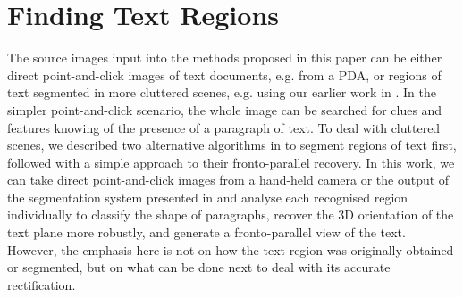 \section{Finding Text Regions}   \label{recoveryusinglines}



The source images input into the methods proposed in this paper can be either
direct point-and-click images of text documents, e.g. from a PDA, or regions of text
segmented in more cluttered scenes, e.g. using our earlier work in
\cite{clark-ijdar-2001}. In the simpler point-and-click scenario, 
the whole image can be searched for clues and features knowing of the presence
of a paragraph of text. To deal with cluttered scenes, we described two alternative
algorithms in \cite{clark-ijdar-2001} to segment regions of text first, followed
with a simple approach to their fronto-parallel recovery. In this work, we can
take direct point-and-click images from a hand-held camera or 
the output of the segmentation system presented in
\cite{clark-ijdar-2001} and analyse each recognised region individually to
classify the shape of paragraphs, recover the 3D orientation of the text plane
more robustly, and generate a fronto-parallel view of the text. However, the
emphasis here is not on how the text region was originally obtained or
segmented, but on what can be done next to deal with its accurate rectification.



